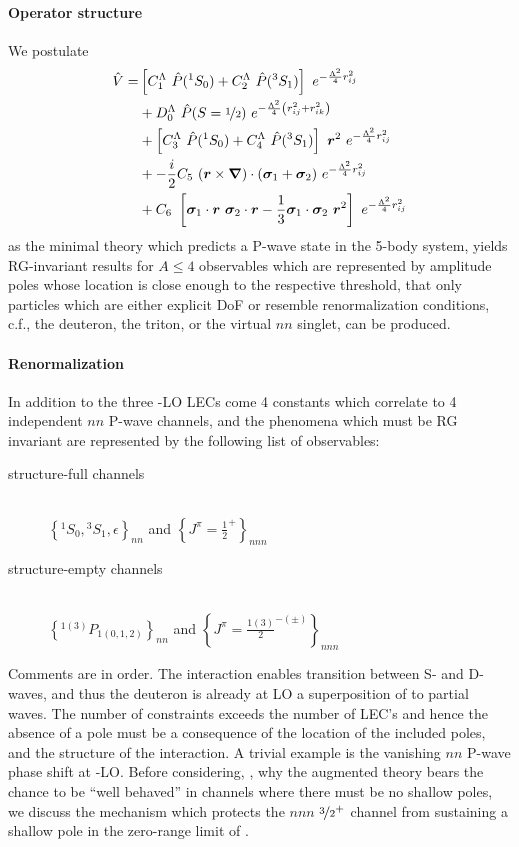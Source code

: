 \documentclass[aps,prd,twocolumn
,tightenlines,letterpaper,
nofootinbib]{revtex4-1}
\begin{document}
\paragraph{Operator structure}
We postulate  
\begin{align*}
\hat{V}=&
   \left[C_1^\Lambda~\hat{P}({}^1S_0) +            C_2^\Lambda~\hat{P}({}^3S_1)\right]~e^{-\frac{\Lambda^2}{4}r_{ij}^2}\\
&+              D_0^\Lambda~\hat{P}(S=\nicefrac{1}{2})~e^{-\frac{\Lambda^2}{4}\left(r_{ij}^2+r_{ik}^2\right)}\\
&+\left[C_3^\Lambda~\hat{P}({}^1S_0) +            C_4^\Lambda~\hat{P}({}^3S_1)\right]~\boldsymbol{r}^2~e^{-\frac{\Lambda^2}{4}r_{ij}^2}\\
&+-\frac{i}{2}C_5~(\boldsymbol{r}\times\boldsymbol{\nabla})\cdot(\boldsymbol{\sigma}_1+\boldsymbol{\sigma}_2)~e^{-\frac{\Lambda^2}{4}r_{ij}^2}\\
&+C_6~\left[\boldsymbol{\sigma}_1\cdot\boldsymbol{r}~\boldsymbol{\sigma}_2\cdot\boldsymbol{r}-\frac{1}{3}\boldsymbol{\sigma}_1\cdot\boldsymbol{\sigma}_2~\boldsymbol{r}^2\right]~e^{-\frac{\Lambda^2}{4}r_{ij}^2}
\end{align*}
as the minimal theory which predicts a P-wave state in the 5-body system, yields RG-invariant results
for $A\leq 4$ observables which are represented by amplitude poles whose location is close enough
to the respective threshold, that only particles which are either explicit DoF or resemble renormalization
conditions, c.f., the deuteron, the triton, or the virtual $nn$ singlet, can be produced.
\paragraph{Renormalization}
In addition to the three \eftnopi-LO LECs come 4 constants which correlate to 4 independent $nn$ P-wave
channels, and the phenomena which must be RG invariant are represented by the following list of observables:
\begin{description}
\item[structure-full channels]\mbox{}\vspace{5pt}\\ $\left\lbrace{}^1S_0,{}^3S_1,\epsilon\right\rbrace_{nn}$ and $\left\lbrace J^\pi=\frac{1}{2}^+\right\rbrace_{nnn}$
\item[structure-empty channels]\mbox{}\vspace{5pt}\\
$\left\lbrace{}^{1(3)}P_{1(0,1,2)}\right\rbrace_{nn}$ and $\left\lbrace J^\pi=\frac{1(3)}{2}^{-(\pm)}\right\rbrace_{nnn}$
\end{description}
Comments are in order. The interaction enables transition between S- and D-waves, and thus the
deuteron is already at LO a superposition of to partial waves. The number of constraints exceeds the
number of LEC's and hence the absence of a pole must be a consequence of the location of the included
poles, and the structure of the interaction. A trivial example is the vanishing $nn$ P-wave phase shift
at \eftnopi-LO. Before considering, \eg, why the augmented theory bears the chance to be ``well behaved''
in channels where there must be no shallow poles, we discuss the mechanism which protects the  $nnn$
$\nicefrac{3}{2}^+$ channel from sustaining a shallow pole in the zero-range limit of \eftnopi.
\end{document}
